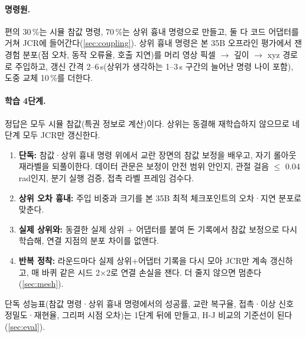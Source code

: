 \paragraph{명령원.} 편의 30\,\%는 시뮬 참값 명령, 70\,\%는 상위 흉내 명령으로 만들고, 둘 다 코드 어댑터를 거쳐 JCR에 들어간다(\cref{sec:coupling}). 상위 흉내 명령은 본 35B 오프라인 평가에서 잰 경험 분포(점 오차, 동작 오류율, 호출 지연)를 머리 영상 픽셀 $\rightarrow$ 깊이 $\rightarrow$ xyz 경로로 주입하고, 갱신 간격 2--6\,s(상위가 생각하는 1--3\,s 구간의 늘어난 명령 나이 포함), 도중 교체 10\,\%를 더한다.

\paragraph{학습 4단계.} 정답은 모두 시뮬 참값(특권 정보로 계산)이다. 상위는 동결해 재학습하지 않으므로 네 단계 모두 JCR만 갱신한다.
\begin{enumerate}
  \item \textbf{단독:} 참값·상위 흉내 명령 위에서 교란 장면의 참값 보정을 배우고, 자기 롤아웃 재라벨을 되풀이한다. 데이터 관문은 보정이 안전 범위 안인지, 관절 걸음 $\le$ 0.04\,rad인지, 분기 실행 검증, 접촉 라벨 프레임 검수다.
  \item \textbf{상위 오차 흉내:} 주입 비중과 크기를 본 35B 최적 체크포인트의 오차·지연 분포로 맞춘다.
  \item \textbf{실제 상위와:} 동결한 실제 상위 + 어댑터를 붙여 돈 기록에서 참값 보정으로 다시 학습해, 연결 지점의 분포 차이를 없앤다.
  \item \textbf{반복 정착:} 라운드마다 실제 상위+어댑터 기록을 다시 모아 JCR만 계속 갱신하고, 매 바퀴 같은 시드 2$\times$2로 연결 손실을 잰다. 더 줄지 않으면 멈춘다(\cref{sec:mesh}).
\end{enumerate}
단독 성능표(참값 명령·상위 흉내 명령에서의 성공률, 교란 복구율, 접촉·이상 신호 정밀도·재현율, 그리퍼 시점 오차)는 1단계 뒤에 만들고, H-J 비교의 기준선이 된다(\cref{sec:eval}).

